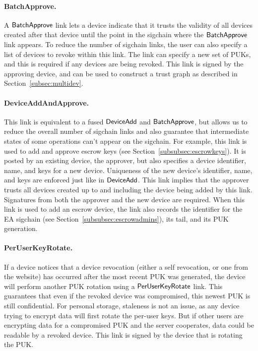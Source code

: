 \paragraph{BatchApprove.} A $\mathsf{BatchApprove}{}$ link lets a device indicate that it trusts the
validity of all devices created after that device until the point in the sigchain where the
$\mathsf{BatchApprove}{}$ link appears. To reduce the number of sigchain links, the user can also specify a
list of devices to revoke within this link. The link can specify a new set of PUKs, and this is
required if any devices are being revoked. This link is signed by the approving device, and can be
used to construct a trust graph as described in Section~\ref{subsec:multidev}.

\paragraph{DeviceAddAndApprove.} This link is equivalent to a fused $\mathsf{DeviceAdd}{}$ and
$\mathsf{BatchApprove}{}$, but allows us to reduce the overall number of sigchain links and also guarantee
that intermediate states of some operations can't appear on the sigchain. For example, this link is
used to add and approve escrow keys (see Section~\ref{subsubsec:escrowkeys}). It is posted by an
existing device, the approver, but also specifies a device identifier, name, and keys for a new
device. Uniqueness of the new device's identifier, name, and keys are enforced just like in
$\mathsf{DeviceAdd}{}$. This link implies that the approver trusts all devices created up to and including
the device being added by this link. Signatures from both the approver and the new device are
required. When this link is used to add an escrow device, the link also records the identifier for
the EA sigchain (see Section~\ref{subsubsec:escrowadmins}), its tail, and its PUK generation.

\paragraph{PerUserKeyRotate.} If a device notices that a device revocation (either a self
revocation, or one from the website) has occurred after the most recent PUK was generated, the
device will perform another PUK rotation using a $\mathsf{PerUserKeyRotate}{}$ link. This guarantees that
even if the revoked device was compromised, this newest PUK is still confidential. For personal
storage, staleness is not an issue, as any device trying to encrypt data will first rotate the
per-user keys. But if other users are encrypting data for a compromised PUK and the server
cooperates, data could be readable by a revoked device. This link is signed by the device that is
rotating the PUK.

